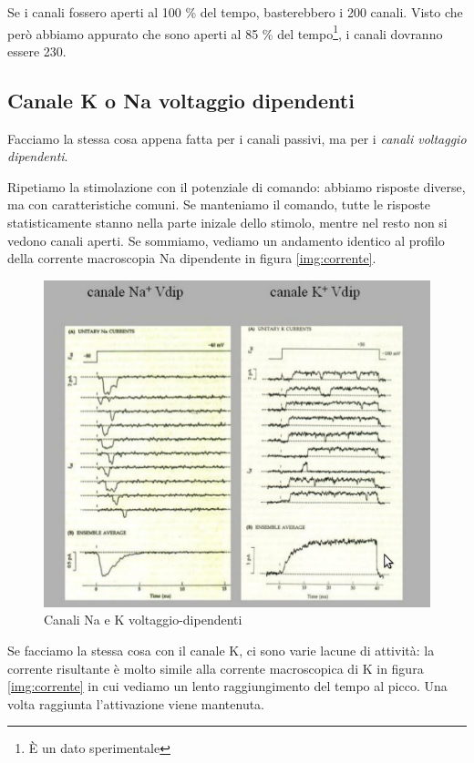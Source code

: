 \documentclass[a4paper,12pt]{article}
\begin{document}
Se i canali fossero aperti al 100 \% del tempo, basterebbero i 200 canali. Visto che però abbiamo appurato che sono aperti al 85 \% del tempo\footnote{È un dato sperimentale}, i canali dovranno essere 230.

\subsection{Canale K o Na voltaggio dipendenti}
Facciamo la stessa cosa appena fatta per i canali passivi, ma per i \emph{canali voltaggio dipendenti}.

Ripetiamo la stimolazione con il potenziale di comando: abbiamo risposte diverse, ma con caratteristiche comuni. Se manteniamo il comando, tutte le risposte statisticamente stanno nella parte inizale dello stimolo, mentre nel resto non si vedono canali aperti. Se sommiamo, vediamo un andamento identico al profilo della corrente macroscopia Na dipendente in figura \ref{img:corrente}.

\begin{figure}[H]
\centering
\includegraphics[scale=0.4]{immagine/voltaggio.jpg}
\caption{Canali Na e K voltaggio-dipendenti}
\end{figure} 

Se facciamo la stessa cosa con il canale K, ci sono varie lacune di attività: la corrente risultante è molto simile alla corrente macroscopica di K in figura \ref{img:corrente} in cui vediamo un lento raggiungimento del tempo al picco. Una volta raggiunta l'attivazione viene mantenuta.
\end{document}
